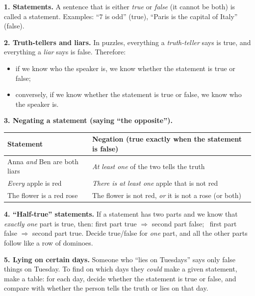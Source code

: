 \begin{knowbox}
\textbf{1. Statements.} A sentence that is either \emph{true} or \emph{false} (it cannot be both) is called a statement.
Examples: ``$7$ is odd'' (true), ``Paris is the capital of Italy'' (false).

\textbf{2. Truth-tellers and liars.} In puzzles, everything a \emph{truth-teller} says is true, and everything a \emph{liar} says is
false. Therefore:
\begin{itemize}[leftmargin=1.4em,itemsep=1pt,topsep=2pt]
  \item if we know who the speaker is, we know whether the statement is true or false;
  \item conversely, if we know whether the statement is true or false, we know who the speaker is.
\end{itemize}

\textbf{3. Negating a statement (saying ``the opposite'').}
\begin{center}
\renewcommand{\arraystretch}{1.25}
\begin{tabular}{|l|l|}
\hline
\rowcolor{tmBlue!10} Statement & Negation (true exactly when the statement is false) \\ \hline
Anna \emph{and} Ben are both liars & \emph{At least one} of the two tells the truth \\ \hline
\emph{Every} apple is red & \emph{There is at least one} apple that is not red \\ \hline
The flower is a red rose & The flower is not red, \emph{or} it is not a rose (or both) \\ \hline
\end{tabular}
\end{center}

\textbf{4. ``Half-true'' statements.} If a statement has two parts and we know that \emph{exactly one} part is true, then:
first part true $\Rightarrow$ second part false; \ first part false $\Rightarrow$ second part true. Decide true/false for \emph{one}
part, and all the other parts follow like a row of dominoes.

\textbf{5. Lying on certain days.} Someone who ``lies on Tuesdays'' says only false things on Tuesday. To find on which days they
\emph{could} make a given statement, make a table: for each day, decide whether the statement is true or false, and compare with
whether the person tells the truth or lies on that day.
\end{knowbox}
